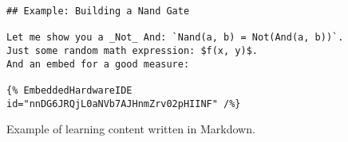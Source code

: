 \begin{figure}[H]
\begin{verbatim}
## Example: Building a Nand Gate

Let me show you a _Not_ And: `Nand(a, b) = Not(And(a, b))`.
Just some random math expression: $f(x, y)$.
And an embed for a good measure:

{% EmbeddedHardwareIDE id="nnDG6JRQjL0aNVb7AJHnmZrv02pHIINF" /%}
\end{verbatim}
    \caption{Example of learning content written in Markdown.}
    \label{fig:design-markdown-example}
\end{figure}
